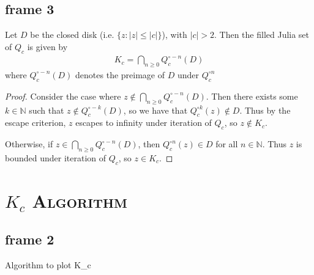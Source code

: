 \documentclass[xcolor=x11names,compress]{beamer}
\renewcommand{\(}{\begin{columns}}
\renewcommand{\)}{\end{columns}}
\newcommand{\<}[1]{\begin{column}{#1}}
\renewcommand{\>}{\end{column}}
\begin{document}
\subsection{frame 3}
\begin{frame}

\begin{theorem}
Let $D$ be the closed disk (i.e. $\{z : |z| \le |c|\}$), with $|c|>2$. Then the filled Julia set of $Q_c$ is given by
\begin{align*}
K_c = \bigcap\limits_{n\ge 0} Q_c^{\circ -n} (D)
\end{align*}
where $Q_c^{\circ -n} (D)$ denotes the preimage of $D$ under $Q_c^{\circ n}$
\end{theorem}

\begin{proof}
    Consider the case where
    $z\notin \bigcap_{n\ge 0} Q_c^{\circ -n} (D)$.
    Then there exists some $k\in \mathbb{N}$ such that $z\notin Q_c^{\circ -k} (D)$,
    so we have that $Q_c^{\circ k}(z) \notin D$. 
    Thus by the escape criterion, $z$ escapes to infinity under iteration
    of $Q_c$, so $z\notin K_c$.  

    Otherwise, if $z\in \bigcap_{n\ge 0} Q_c^{\circ -n} (D)$, then 
     $Q_c^{\circ n}(z) \in D$ for all $n\in \mathbb{N}$. Thus $z$ is bounded under
     iteration of $Q_c$, so $z\in K_c$.
\end{proof}
\end{frame}


\section{\scshape $K_c$ Algorithm}

\subsection{frame 2}
\begin{frame}

\begin{algorithm}[H]
  \DontPrintSemicolon
  \LinesNumbered


 {
}
\caption{Algorithm to plot K\_c }
\end{algorithm}

\end{frame}
\end{document}
